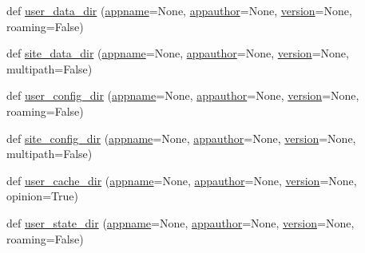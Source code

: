 \begin{DoxyCompactItemize}
\item 
def \hyperlink{namespacepip_1_1__vendor_1_1appdirs_a451d624e285b0b0d5d1252ee67626d11}{user\+\_\+data\+\_\+dir} (\hyperlink{namespacepip_1_1__vendor_1_1appdirs_ac05115f2b840ca0dd64e22b7fb956bfc}{appname}=None, \hyperlink{namespacepip_1_1__vendor_1_1appdirs_a6d123a471e72ef1998f585edc02e09a0}{appauthor}=None, \hyperlink{namespacepip_1_1__vendor_1_1appdirs_a87a875118dd18683cfabea51ad8ed700}{version}=None, roaming=False)
\item 
def \hyperlink{namespacepip_1_1__vendor_1_1appdirs_ac2abb1223764b7a65ed8543bc8916010}{site\+\_\+data\+\_\+dir} (\hyperlink{namespacepip_1_1__vendor_1_1appdirs_ac05115f2b840ca0dd64e22b7fb956bfc}{appname}=None, \hyperlink{namespacepip_1_1__vendor_1_1appdirs_a6d123a471e72ef1998f585edc02e09a0}{appauthor}=None, \hyperlink{namespacepip_1_1__vendor_1_1appdirs_a87a875118dd18683cfabea51ad8ed700}{version}=None, multipath=False)
\item 
def \hyperlink{namespacepip_1_1__vendor_1_1appdirs_ad0a8829c143ff53734b0b348b3f603dd}{user\+\_\+config\+\_\+dir} (\hyperlink{namespacepip_1_1__vendor_1_1appdirs_ac05115f2b840ca0dd64e22b7fb956bfc}{appname}=None, \hyperlink{namespacepip_1_1__vendor_1_1appdirs_a6d123a471e72ef1998f585edc02e09a0}{appauthor}=None, \hyperlink{namespacepip_1_1__vendor_1_1appdirs_a87a875118dd18683cfabea51ad8ed700}{version}=None, roaming=False)
\item 
def \hyperlink{namespacepip_1_1__vendor_1_1appdirs_ab09d66ec806f315bb8450d8188e19396}{site\+\_\+config\+\_\+dir} (\hyperlink{namespacepip_1_1__vendor_1_1appdirs_ac05115f2b840ca0dd64e22b7fb956bfc}{appname}=None, \hyperlink{namespacepip_1_1__vendor_1_1appdirs_a6d123a471e72ef1998f585edc02e09a0}{appauthor}=None, \hyperlink{namespacepip_1_1__vendor_1_1appdirs_a87a875118dd18683cfabea51ad8ed700}{version}=None, multipath=False)
\item 
def \hyperlink{namespacepip_1_1__vendor_1_1appdirs_a44e98d2baf834fefa758fd93737aff70}{user\+\_\+cache\+\_\+dir} (\hyperlink{namespacepip_1_1__vendor_1_1appdirs_ac05115f2b840ca0dd64e22b7fb956bfc}{appname}=None, \hyperlink{namespacepip_1_1__vendor_1_1appdirs_a6d123a471e72ef1998f585edc02e09a0}{appauthor}=None, \hyperlink{namespacepip_1_1__vendor_1_1appdirs_a87a875118dd18683cfabea51ad8ed700}{version}=None, opinion=True)
\item 
def \hyperlink{namespacepip_1_1__vendor_1_1appdirs_abd5fa21f3afe4362028c6ab86d7e83d4}{user\+\_\+state\+\_\+dir} (\hyperlink{namespacepip_1_1__vendor_1_1appdirs_ac05115f2b840ca0dd64e22b7fb956bfc}{appname}=None, \hyperlink{namespacepip_1_1__vendor_1_1appdirs_a6d123a471e72ef1998f585edc02e09a0}{appauthor}=None, \hyperlink{namespacepip_1_1__vendor_1_1appdirs_a87a875118dd18683cfabea51ad8ed700}{version}=None, roaming=False)

\end{DoxyCompactItemize}
